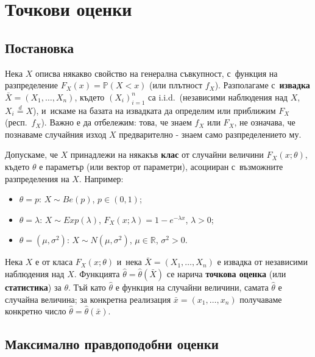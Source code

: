 \chapter{Точкови оценки}

\section{Постановка}

\begin{rembox}[Идея]
Нека $X$ описва някакво свойство на генерална съвкупност, с~функция
на разпределение $F_X(x)=\mathbb P(X<x)$ (или плътност $f_X$).
Разполагаме с~\textbf{извадка} $\bar X=(X_1,\dots,X_n)$, където
$(X_i)_{i=1}^n$ са i.i.d.\ (независими наблюдения над $X$,
$X_i\stackrel d=X$), и~искаме на базата на извадката да определим
или приближим $F_X$ (респ.\ $f_X$). Важно е да отбележим: това, че
знаем $f_X$ или $F_X$, не означава, че познаваме случайния изход
$X$ предварително - знаем само разпределението му.
\end{rembox}

\begin{rembox}
Допускаме, че $X$ принадлежи на някакъв \textbf{клас} от случайни
величини $F_X(x;\theta)$, където $\theta$ е параметър (или вектор
от параметри), асоцииран с~възможните разпределения на $X$. Например:
\begin{itemize}[nosep]
  \item $\theta=p$: $X\sim Be(p)$, $p\in(0,1)$;
  \item $\theta=\lambda$: $X\sim Exp(\lambda)$, $F_X(x;\lambda)=1-e^{-\lambda x}$, $\lambda>0$;
  \item $\theta=(\mu,\sigma^2)$: $X\sim N(\mu,\sigma^2)$, $\mu\in\mathbb R$, $\sigma^2>0$.
\end{itemize}
\end{rembox}

\begin{defbox}
Нека $X$ е от класа $F_X(x;\theta)$ и~нека $\bar X=(X_1,\dots,X_n)$
е извадка от независими наблюдения над $X$. Функцията
$\hat\theta=\hat\theta(\bar X)$ се нарича \textbf{точкова оценка}
(или \textbf{статистика}) за $\theta$. Тъй като $\hat\theta$ е
функция на случайни величини, самата $\hat\theta$ е случайна
величина; за конкретна реализация $\bar x=(x_1,\dots,x_n)$ получаваме
конкретно число $\hat\theta=\hat\theta(\bar x)$.
\end{defbox}

\section{Максимално правдоподобни оценки}

